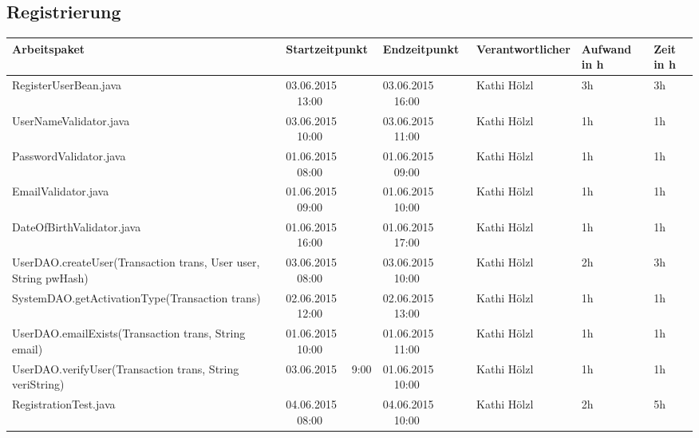 \begin{landscape}
	\subsection{Registrierung}
	\begin{tabular}{|p{10.3cm}|p{3.2cm}|p{3.2cm}|p{3.5cm}|p{1.7cm}|p{1.5cm}|}
		\hline  \textbf{Arbeitspaket} & \textbf{Startzeitpunkt} & \textbf{Endzeitpunkt} & \textbf{Verantwortlicher}  & \textbf{Aufwand in h} & \textbf{Zeit in h}\\ 
		\hline   RegisterUserBean.java                                & 03.06.2015 \ \ 13:00     & 03.06.2015 \ \ 16:00     & Kathi Hölzl &      3h        &   3h \\
		\hline   UserNameValidator.java                               & 03.06.2015 \ \ 10:00     & 03.06.2015 \ \ 11:00     & Kathi Hölzl &      1h        &   1h\\
		\hline   PasswordValidator.java                               & 01.06.2015 \ \ 08:00     & 01.06.2015 \ \ 09:00     & Kathi Hölzl &      1h        &   1h\\
		\hline   EmailValidator.java                                  & 01.06.2015 \ \ 09:00     & 01.06.2015 \ \ 10:00     & Kathi Hölzl &      1h        &   1h\\
		\hline   DateOfBirthValidator.java                            & 01.06.2015 \ \ 16:00     & 01.06.2015 \ \ 17:00     & Kathi Hölzl &      1h        &   1h\\
		\hline   UserDAO.createUser(Transaction trans, User user, String pwHash)     & 03.06.2015 \ \ 08:00     & 03.06.2015 \ \ 10:00       & Kathi Hölzl  &      2h    &    3h\\
		\hline   SystemDAO.getActivationType(Transaction trans)       & 02.06.2015 \ \ 12:00     & 02.06.2015 \ \ 13:00     & Kathi Hölzl  &      1h        &   1h\\
		\hline   UserDAO.emailExists(Transaction trans, String email) & 01.06.2015 \ \ 10:00     & 01.06.2015 \ \ 11:00     & Kathi Hölzl  &      1h        &   1h\\
		\hline   UserDAO.verifyUser(Transaction trans, String veriString) & 03.06.2015 \ \ 9:00     & 01.06.2015 \ \ 10:00  & Kathi Hölzl  &      1h        &   1h\\
		\hline   RegistrationTest.java                                & 04.06.2015 \ \ 08:00     & 04.06.2015 \ \ 10:00     & Kathi Hölzl  &      2h        &   5h\\
		\hline 
	\end{tabular} \ \\
	\ \\
	

\end{landscape}
